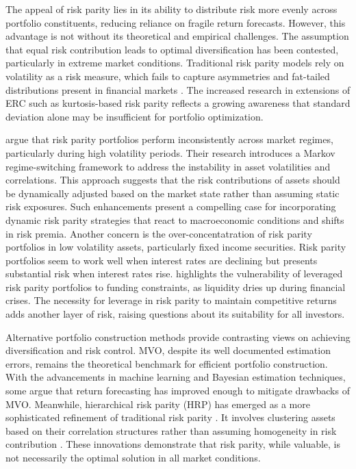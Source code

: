\documentclass[preprint, 3p,
authoryear]{elsarticle} %
\begin{document}
The appeal of risk parity lies in its ability to distribute risk more
evenly across portfolio constituents, reducing reliance on fragile
return forecasts. However, this advantage is not without its theoretical
and empirical challenges. The assumption that equal risk contribution
leads to optimal diversification has been contested, particularly in
extreme market conditions. Traditional risk parity models rely on
volatility as a risk measure, which fails to capture asymmetries and
fat-tailed distributions present in financial markets \citep{braga2023}.
The increased research in extensions of ERC such as kurtosis-based risk
parity reflects a growing awareness that standard deviation alone may be
insufficient for portfolio optimization.

\citet{costa2019} argue that risk parity portfolios perform
inconsistently across market regimes, particularly during high
volatility periods. Their research introduces a Markov regime-switching
framework to address the instability in asset volatilities and
correlations. This approach suggests that the risk contributions of
assets should be dynamically adjusted based on the market state rather
than assuming static risk exposures. Such enhancements present a
compelling case for incorporating dynamic risk parity strategies that
react to macroeconomic conditions and shifts in risk premia. Another
concern is the over-concentatration of risk parity portfolios in low
volatility assets, particularly fixed income securities. Risk parity
portfolios seem to work well when interest rates are declining but
presents substantial risk when interest rates rise. \citet{panulo2014}
highlights the vulnerability of leveraged risk parity portfolios to
funding constraints, as liquidity dries up during financial crises. The
necessity for leverage in risk parity to maintain competitive returns
adds another layer of risk, raising questions about its suitability for
all investors.

Alternative portfolio construction methods provide contrasting views on
achieving diversification and risk control. MVO, despite its well
documented estimation errors, remains the theoretical benchmark for
efficient portfolio construction. With the advancements in machine
learning and Bayesian estimation techniques, some argue that return
forecasting has improved enough to mitigate drawbacks of MVO. Meanwhile,
hierarchical risk parity (HRP) has emerged as a more sophisticated
refinement of traditional risk parity \citep{nico2019}. It involves
clustering assets based on their correlation structures rather than
assuming homogeneity in risk contribution \citep{palit2024}. These
innovations demonstrate that risk parity, while valuable, is not
necessarily the optimal solution in all market conditions.
\end{document}

